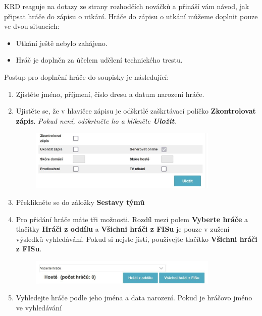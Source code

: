 \documentclass{newsletter}
\begin{document}
\clearpage
{}
KRD reaguje na dotazy ze strany rozhodčích nováčků a přináší vám návod, jak připsat hráče do zápisu o utkání. Hráče do zápisu o utkání můžeme doplnit pouze ve dvou situacích:
\begin{itemize}
	\item Utkání ještě nebylo zahájeno.
	\item Hráč je doplněn za účelem udělení technického trestu.
\end{itemize}

Postup pro doplnění hráče do soupisky je následující:
\begin{enumerate}
	\item Zjistěte jméno, příjmení, číslo dresu a datum narození hráče.
	\item Ujistěte se, že v hlavičce zápisu je odškrtlé zaškrtávací políčko \textbf{Zkontrolovat zápis}.\textit{ Pokud není, odškrtněte ho a klikněte \textbf{Uložit}}.
	\begin{figure}[h]
		\centering
		\includegraphics[width=0.85\textwidth, keepaspectratio]{zkontrolovat_zapis}
	\end{figure}
	\item Překlikněte se do záložky \textbf{Sestavy týmů}
	\item Pro přidání hráče máte tři možnosti. Rozdíl mezi polem \textbf{Vyberte hráče} a tlačítky \textbf{Hráči z oddílu} a \textbf{Všichni hráči z FISu} je pouze v zužení výsledků vyhledávání. Pokud si nejste jisti, používejte tlačítko \textbf{Všichni hráči z FISu}.
	\begin{figure}[h]
		\centering
		\includegraphics[width=0.85\textwidth, keepaspectratio]{vyber_hrace_soupiska}
	\end{figure}
	\clearpage
	\item Vyhledejte hráče podle jeho jména a data narození. Pokud je hráčovo jméno ve vyhledávání
	\begin{itemize}

\end{itemize}
\end{enumerate}
\end{document}
